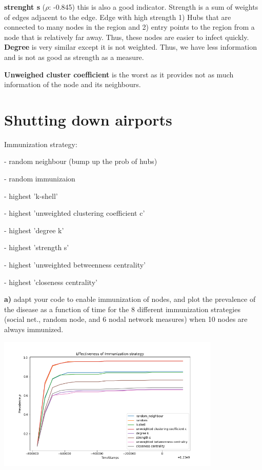 \documentclass[a4paper,12pt]{article}
\begin{document}
\bigskip
\textbf{strenght s} ($\rho$: -0.845) this is also a good indicator. Strength is a sum
of weights of edges adjacent to the edge. Edge with high strength 1) Hubs
that are connected to many nodes in the region and 2) entry points to the region
from a node that is relatively far away. Thus, these nodes are easier to infect quickly.
\textbf{Degree} is very similar except it is not weighted. Thus, we have less information and
is not as good as strength as a measure.

\bigskip
\textbf{Unweighed cluster coefficient} is the worst as it provides not as much information
of the node and its neighbours.

\section{Shutting down airports}
Immunization strategy:

- random neighbour (bump up the prob of hubs)

- random immunizaion

- highest 'k-shell'

- highest 'unweighted clustering coefficient c'

- highest 'degree k'

- highest 'strength s'

- highest 'unweighted betweenness centrality'

- highest 'closeness centrality'

\bigskip
\textbf{a)} adapt your code to enable immunization of nodes, and plot the prevalence of the
disease as a function of time for the 8 different immunization strategies (social net., random
node, and 6 nodal network measures) when 10 nodes are always immunized.

\begin{center}
  \includegraphics[width=0.8\textwidth]{immune_strategy}
\end{center}
\end{document}

